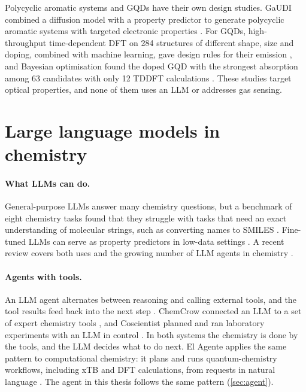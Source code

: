 Polycyclic aromatic systems and GQDs have their own design studies. GaUDI combined a diffusion
model with a property predictor to generate polycyclic aromatic systems with targeted electronic
properties \cite{weiss2023gaudi}. For GQDs, high-throughput time-dependent DFT on 284 structures
of different shape, size and doping, combined with machine learning, gave design rules for their
emission \cite{ozdemir2024gqd}, and Bayesian optimisation found the doped GQD with the strongest
absorption among 63 candidates with only 12 TDDFT calculations \cite{ozonder2022bo}. These studies
target optical properties, and none of them uses an LLM or addresses gas sensing.

\section{Large language models in chemistry}
\label{sec:lit-llm}

\paragraph{What LLMs can do.}
General-purpose LLMs answer many chemistry questions, but a benchmark of eight chemistry tasks
found that they struggle with tasks that need an exact understanding of molecular strings, such as
converting names to SMILES \cite{guo2023llmchem}. Fine-tuned LLMs can serve as property predictors
in low-data settings \cite{jablonka2024leveraging}. A recent review covers both uses and the
growing number of LLM agents in chemistry \cite{ramos2025review}.

\paragraph{Agents with tools.}
An LLM agent alternates between reasoning and calling external tools, and the tool results feed
back into the next step \cite{yao2023react}. ChemCrow connected an LLM to a set of expert chemistry
tools \cite{bran2024chemcrow}, and Coscientist planned and ran laboratory experiments with an LLM
in control \cite{boiko2023coscientist}. In both systems the chemistry is done by the tools, and
the LLM decides what to do next. El Agente applies the same pattern to computational chemistry: it
plans and runs quantum-chemistry workflows, including xTB and DFT calculations, from requests in
natural language \cite{zou2025elagente}. The agent in this thesis follows the same pattern
(\cref{sec:agent}).

